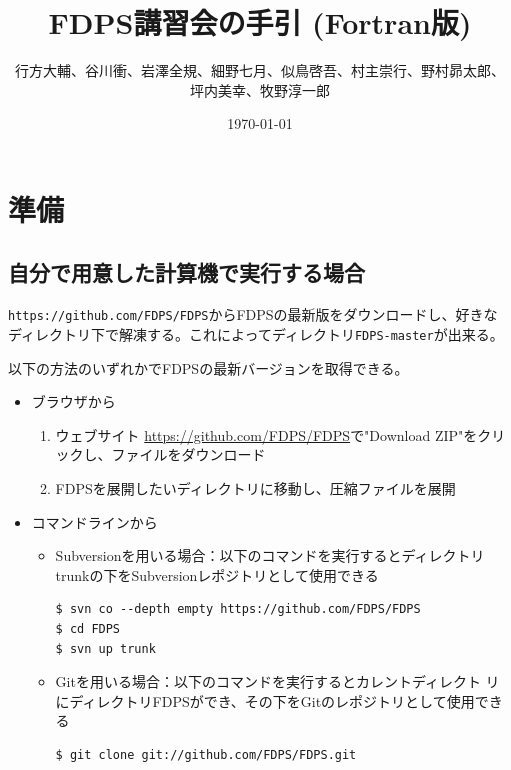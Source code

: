 \documentclass[12pt,a4paper,dvipdfmx]{jarticle}
\title{FDPS講習会の手引 (Fortran版)}
\author{行方大輔、谷川衝、岩澤全規、細野七月、似鳥啓吾、村主崇行、野村昴太郎、 \\ 坪内美幸、牧野淳一郎}
\date{\today}
\begin{document}
\maketitle
\tableofcontents

\newpage





\section{準備}


\subsection{自分で用意した計算機で実行する場合}
\texttt{https://github.com/FDPS/FDPS}からFDPSの最新版をダウンロードし、好きな
ディレクトリ下で解凍する。これによってディレクトリ\texttt{FDPS-master}が出来る。


以下の方法のいずれかでFDPSの最新バージョンを取得できる。
\begin{itemize}
\item ブラウザから
  \begin{enumerate}
  \item ウェブサイト \url{https://github.com/FDPS/FDPS}で"Download ZIP"をクリックし、ファイルをダウンロード
  \item FDPSを展開したいディレクトリに移動し、圧縮ファイルを展開
  \end{enumerate}

\item コマンドラインから
  \begin{itemize}    
  \item Subversionを用いる場合：以下のコマンドを実行するとディレクトリ
    trunkの下をSubversionレポジトリとして使用できる
    \begin{screen}
\begin{verbatim}
$ svn co --depth empty https://github.com/FDPS/FDPS
$ cd FDPS
$ svn up trunk
\end{verbatim}
    \end{screen}

  \item Gitを用いる場合：以下のコマンドを実行するとカレントディレクト
    リにディレクトリFDPSができ、その下をGitのレポジトリとして使用できる
    \begin{screen}
\begin{verbatim}
$ git clone git://github.com/FDPS/FDPS.git
\end{verbatim}
    \end{screen}    

  \end{itemize}

\end{itemize}
\end{document}
